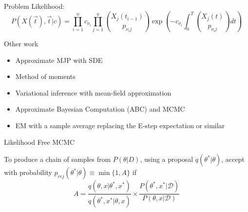 \documentclass[12pt,a4paper,t,xcolor=dvipsnames,slidestop,compress,mathserif]{beamer}
\newcommand{\red}[1]{{\color{red}#1}}
\begin{document}
\begin{frame}{Problem}
Likelihood: $$P(X(\vec{t}), \vec{t}|c) = \prod_{i=1}^n c_{\nu_{i}} \prod_{j=1}^u {{X_{j}(t_{i-1})}\choose{p_{{\nu_{i}}j}}}\exp\left(-c_{\nu_{i}}\int_0^T {{X_j(t)}\choose{p_{{\nu_{i}}j}}} dt\right)$$
\end{frame}

\begin{frame}{Other work}
\begin{itemize} 
\item Approximate MJP with SDE \cite{golightly2005bayesian,bayes_stoch_mod,fearnhead2014inference}

\item Method of moments \cite{milner2013moment,zechner2012moment}

\item Variational inference with mean-field approximation  \cite{opper2008variational} 

\item Approximate Bayesian Computation (ABC) and MCMC
\cite{owen2014ABC_LF-MCMCcomparison,owen2014scalable,hobolth2009simulation,zechner2014scalable}


\item EM with a sample average replacing the E-step expectation or similar \cite{gupta2014comparison,srivastava_rawlings2014stoch_opt,bayer2015stoch_em,horvath2008parameter,daigle2012accelerated}
\end{itemize}


\end{frame}
\begin{frame}{Likelihood Free MCMC}

To produce a chain of samples from $P(\theta|D)$, using a proposal $q(\theta^*|\theta)$, accept with probability $p_{rej}(\theta^*|\theta)\equiv\min \{1, A\}$ if $$A=\frac{q(\theta,x|\theta^*,x^*)}{q(\theta^*,x^*|\theta,x)} \times \frac{P(\theta^*,x^*|\mathcal{D})}{P(\theta,x|\mathcal{D})}
$$

\end{frame}
%
%
%
%
\end{document}
